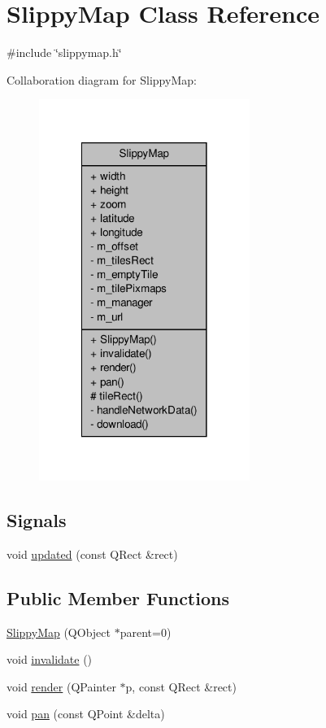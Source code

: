 \hypertarget{classSlippyMap}{\section{Slippy\-Map Class Reference}
\label{classSlippyMap}
}


{\ttfamily \#include \char`\"{}slippymap.\-h\char`\"{}}



Collaboration diagram for Slippy\-Map\-:\nopagebreak
\begin{figure}[H]
\begin{center}
\leavevmode
\includegraphics[width=194pt]{classSlippyMap__coll__graph}
\end{center}
\end{figure}
\subsection*{Signals}
\begin{DoxyCompactItemize}
\item 
void \hyperlink{classSlippyMap_a6ff062c778eec629347d834976760c98}{updated} (const Q\-Rect \&rect)
\end{DoxyCompactItemize}
\subsection*{Public Member Functions}
\begin{DoxyCompactItemize}
\item 
\hyperlink{classSlippyMap_aefaa28b154b2e9602b391668ed167080}{Slippy\-Map} (Q\-Object $\ast$parent=0)
\item 
void \hyperlink{classSlippyMap_aa8a2647176ff7db85ab52ce9e7acb549}{invalidate} ()
\item 
void \hyperlink{classSlippyMap_ada1e00e2870d0fdeb70c037b3222a0ad}{render} (Q\-Painter $\ast$p, const Q\-Rect \&rect)
\item 
void \hyperlink{classSlippyMap_ae954bbb164e84e5cecf3fbb518eb266c}{pan} (const Q\-Point \&delta)
\end{DoxyCompactItemize}
